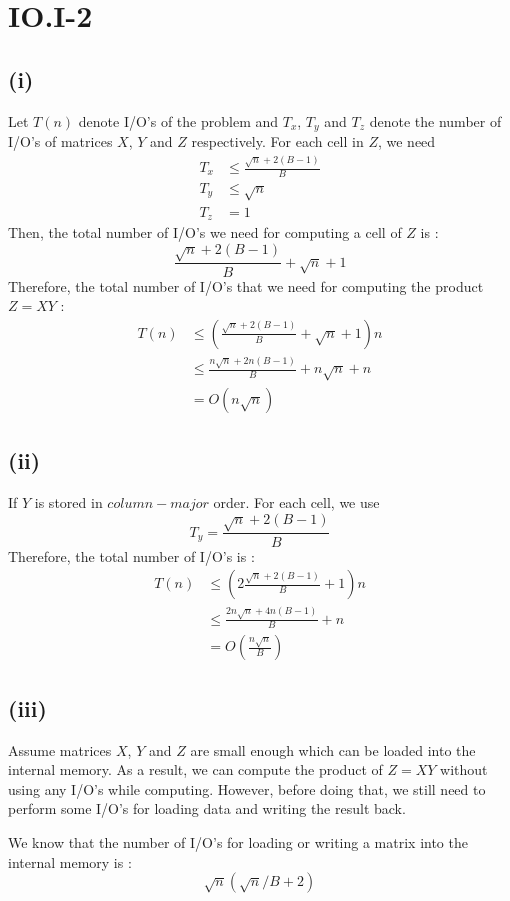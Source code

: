\section*{IO.I-2}
\subsection*{(i)}
Let $T(n)$ denote I/O's of the problem and $T_x$, $T_y$ and $T_z$ denote the number of I/O's of matrices $X$, $Y$ and $Z$ respectively.
For each cell in $Z$, we need
\begin{align*}
	T_x &\leq \frac{\sqrt{n}+2(B-1)}{B}\\
	T_y &\leq \sqrt{n} \\
	T_z &= 1
\end{align*}
Then, the total number of I/O's we need for computing a cell of $Z$ is :
$$\frac{\sqrt{n}+2(B-1)}{B} + \sqrt{n} + 1$$
Therefore, the total number of I/O's that we need for computing the product $Z=XY$ :
\begin{align*}
	T(n) &\leq ( \frac{\sqrt{n}+2(B-1)}{B} + \sqrt{n} + 1	)n\\
	&\leq \frac{n\sqrt{n}+2n(B-1)}{B} + n\sqrt{n} + n \\
	&= O(n\sqrt{n})
\end{align*}

\subsection*{(ii)}
If $Y$ is stored in $column-major$ order. For each cell, we use $$T_y=\frac{\sqrt{n}+2(B-1)}{B}$$
Therefore, the total number of I/O's is :
\begin{align*}
	T(n) &\leq ( 2\frac{\sqrt{n}+2(B-1)}{B} + 1	)n\\
	&\leq \frac{2n\sqrt{n}+4n(B-1)}{B} + n \\
	&= O(\frac{n\sqrt{n}}{B})
\end{align*}

\subsection*{(iii)}

Assume matrices $X$, $Y$ and $Z$ are small enough which can be loaded into the internal memory. As a result, we can compute the product of $Z=XY$
without using any I/O's while computing. However, before doing that, we still need to perform some I/O's for loading data and writing the result back.

We know that the number of I/O's for loading or writing a matrix into the internal memory is :
$$\sqrt{n}(\sqrt{n}/B+2)$$

